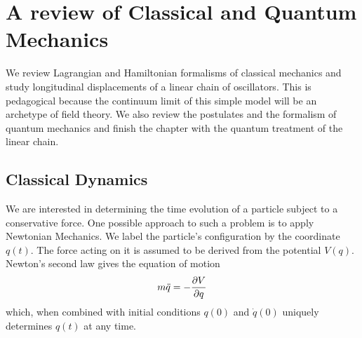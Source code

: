 \chapter{A review of Classical and Quantum Mechanics}
We review Lagrangian and Hamiltonian formalisms of classical mechanics and study longitudinal displacements of a linear chain of oscillators. This is pedagogical because the continuum limit of this simple model will be an archetype of field theory. We also review the postulates and the formalism of quantum mechanics and finish the chapter with the quantum treatment of the linear chain.

\section{Classical Dynamics}

We are interested in determining the time evolution of a particle subject to a conservative force. One possible approach to such a problem is to apply Newtonian Mechanics. We label the particle's configuration by the coordinate $q(t)$. The force acting on it is assumed to be derived from the potential $V(q)$. Newton's second law gives the equation of motion
\begin{equation}
    m\Ddot{q}=-\pdv{V}{q}
\end{equation}
which, when combined with initial conditions $q(0)$ and $\Dot{q}(0)$ uniquely determines $q(t)$ at any time.\\

